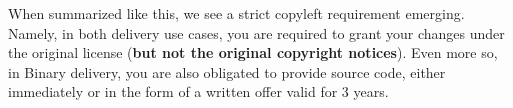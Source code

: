When summarized like this, we see a strict copyleft requirement emerging. Namely, in both delivery use cases, you are required to grant your changes under the original license (\textbf{but not the original copyright notices}). Even more so, in Binary delivery, you are also obligated to provide source code, either immediately or in the form of a written offer valid for 3 years.